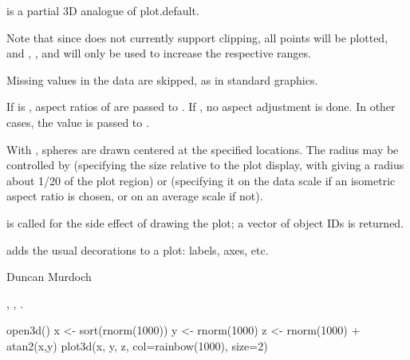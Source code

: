 \documentclass{article}
\begin{document}
\begin{Details}\relax
{} is a partial 3D analogue of plot.default.

Note that since  does not currently support
clipping, all points will be plotted, and , , and 
will only be used to increase the respective ranges.

Missing values in the data are skipped, as in standard graphics.

If  is , aspect ratios of  are passed to
.  If , no aspect adjustment is done.  In other
cases, the value is passed to .

With , spheres are drawn centered at the specified locations.
The radius may be controlled by  (specifying the size relative
to the plot display, with  giving a radius 
about 1/20 of the plot region) or  (specifying it on the data scale
if an isometric aspect ratio is chosen, or on an average scale
if not).
\end{Details}
\begin{Value}
 is called for the side effect of drawing the plot; a vector
of object IDs is returned.

 adds the usual decorations to a plot:  labels, axes, etc.
\end{Value}
\begin{Author}\relax
Duncan Murdoch
\end{Author}
\begin{SeeAlso}\relax
{},  
, .
\end{SeeAlso}
\begin{Examples}
\begin{ExampleCode}
  open3d()
  x <- sort(rnorm(1000))
  y <- rnorm(1000)
  z <- rnorm(1000) + atan2(x,y)
  plot3d(x, y, z, col=rainbow(1000), size=2)
\end{ExampleCode}
\end{Examples}
\end{document}
